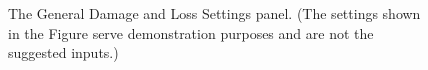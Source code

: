\begin{figure}[!htbp]
  \caption{The General Damage and Loss Settings panel. (The settings shown in the Figure serve demonstration purposes and are not the suggested inputs.)}
  \label{fig:dl_hazus_general}
\end{figure}

